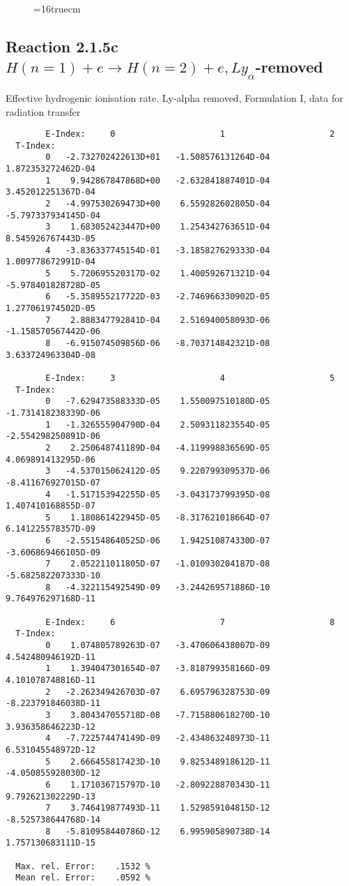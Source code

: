 \documentclass[12pt]{article}
\begin{document}
\begin{figure} \label{2.1.5b}
\epsfxsize=16truecm
\end{figure}
\newpage

\subsection{
Reaction 2.1.5c  $H(n=1) + e \rightarrow H(n=2) + e, Ly_\alpha$-removed}


   Effective hydrogenic ionisation rate. 
   Ly-alpha removed, Formulation I, data for radiation transfer

\begin{small}\begin{verbatim}
        E-Index:     0                     1                     2
  T-Index:
        0   -2.732702422613D+01   -1.508576131264D-04    1.872353272462D-04
        1    9.942867847868D+00   -2.632841887401D-04    3.452012251367D-04
        2   -4.997530269473D+00    6.559282602805D-04   -5.797337934145D-04
        3    1.683052423447D+00    1.254342763651D-04    8.545926767443D-05
        4   -3.836337745154D-01   -3.185827629333D-04    1.009778672991D-04
        5    5.720695520317D-02    1.400592671321D-04   -5.978401828728D-05
        6   -5.358955217722D-03   -2.746966330902D-05    1.277061974502D-05
        7    2.888347792841D-04    2.516940058093D-06   -1.158570567442D-06
        8   -6.915074509856D-06   -8.703714842321D-08    3.633724963304D-08

        E-Index:     3                     4                     5
  T-Index:
        0   -7.629473588333D-05    1.550097510180D-05   -1.731418238339D-06
        1   -1.326555904790D-04    2.509311823554D-05   -2.554298250891D-06
        2    2.250648741189D-04   -4.119998836569D-05    4.069891413295D-06
        3   -4.537015062412D-05    9.220799309537D-06   -8.411676927015D-07
        4   -1.517153942255D-05   -3.043173799395D-08    1.407410168855D-07
        5    1.180861422945D-05   -8.317621018664D-07    6.141225578357D-09
        6   -2.551548640525D-06    1.942510874330D-07   -3.606869466105D-09
        7    2.052211011805D-07   -1.010930204187D-08   -5.682582207333D-10
        8   -4.322115492549D-09   -3.244269571886D-10    9.764976297168D-11

        E-Index:     6                     7                     8
  T-Index:
        0    1.074805789263D-07   -3.470606438007D-09    4.542480946192D-11
        1    1.394047301654D-07   -3.818799358166D-09    4.101078748816D-11
        2   -2.262349426703D-07    6.695796328753D-09   -8.223791846038D-11
        3    3.804347055718D-08   -7.715880618270D-10    3.936358646223D-12
        4   -7.722574474149D-09   -2.434863248973D-11    6.531045548972D-12
        5    2.666455817423D-10    9.825348918612D-11   -4.050855928030D-12
        6    1.171036715797D-10   -2.809228870343D-11    9.792621302229D-13
        7    3.746419877493D-11    1.529859104815D-12   -8.525738644768D-14
        8   -5.810958440786D-12    6.995905890738D-14    1.757130683111D-15

  Max. rel. Error:    .1532 %
  Mean rel. Error:    .0592 %


\end{verbatim}\end{small}
\end{document}
